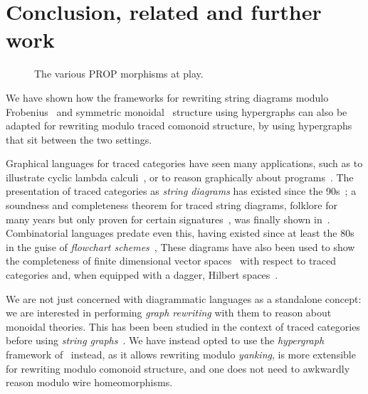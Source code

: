 \section{Conclusion, related and further work}

\begin{figure}
    \centering
    
    \caption{The various PROP morphisms at play.}
    \label{fig:roadmap}
\end{figure}

We have shown how the frameworks for rewriting string diagrams modulo
Frobenius~\cite{bonchi2022string} and symmetric
monoidal~\cite{bonchi2022stringa} structure using hypergraphs can also be
adapted for rewriting modulo traced comonoid structure, by using
hypergraphs that sit between the two settings.

Graphical languages for traced categories have seen many applications, such as
to illustrate cyclic lambda calculi~\cite{hasegawa1997recursion}, or to reason
graphically about programs~\cite{schweimeier1999categorical}.
The presentation of traced categories as \emph{string diagrams} has existed
since the 90s~\cite{joyal1991geometry,joyal1996traced}; a soundness and
completeness theorem for traced string diagrams, folklore for many years
but only proven for certain signatures~\cite{selinger2011survey}, was finally
shown in~\cite{kissinger2014abstract}.
Combinatorial languages predate even this, having existed since at least the 80s
in the guise of
\emph{flowchart schemes}~\cite{stefanescu1990feedback,cazanescu1990new,cazanescu1994feedback},
These diagrams have also been used to show the completeness of finite dimensional
vector spaces~\cite{hasegawa2008finite} with respect to traced categories and,
when equipped with a dagger, Hilbert spaces~\cite{selinger2012finite}.

We are not just concerned with diagrammatic languages as a standalone concept:
we are interested in performing \emph{graph rewriting} with them to reason about
monoidal theories.
This has been been studied in the context of traced categories before using
\emph{string graphs}~\cite{kissinger2012pictures,dixon2013opengraphs}.
We have instead opted to use the \emph{hypergraph} framework
of~\cite{bonchi2022string,bonchi2022stringa,bonchi2022stringb} instead, as it
allows rewriting modulo \emph{yanking}, is more extensible for rewriting modulo
comonoid structure, and one does not need to awkwardly reason modulo wire
homeomorphisms.

